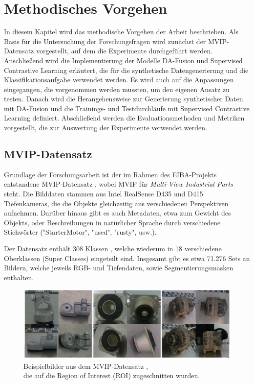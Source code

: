 \chapter{Methodisches Vorgehen}

In diesem Kapitel wird das methodische Vorgehen der Arbeit beschrieben. Als Basis für die Untersuchung der Forschungsfragen wird zunächst der MVIP-Datensatz vorgestellt, auf dem die Experimente durchgeführt werden. Anschließend wird die Implementierung der Modelle DA-Fusion und Supervised Contrastive Learning erläutert, die für die synthetische Datengenerierung und die Klassifikationsaufgabe verwendet werden. Es wird auch auf die Anpassungen eingegangen, die vorgenommen werden mussten, um den eigenen Ansatz zu testen. Danach wird die Herangehensweise zur Generierung synthetischer Daten mit DA-Fusion und die Trainings- und Testdurchläufe mit Supervised Contrastive Learning definiert. Abschließend werden die Evaluationsmethoden und Metriken vorgestellt, die zur Auswertung der Experimente verwendet werden.

\section{MVIP-Datensatz} \label{sec:dataset}


Grundlage der Forschungsarbeit ist der im Rahmen des EIBA-Projekts entstandene MVIP-Datensatz \parencite{Koch2023mvip}, wobei MVIP für \textit{Multi-View Industrial Parts} steht. Die Bilddaten stammen aus Intel RealSense D435 und D415 Tiefenkameras, die die Objekte gleichzeitig aus verschiedenen Perspektiven aufnehmen. Darüber hinaus gibt es auch Metadaten, etwa zum Gewicht des Objekts, oder Beschreibungen in natürlicher Sprache durch verschiedene Stichwörter ("StarterMotor", "used", "rusty", usw.).

Der Datensatz enthält 308 Klassen , welche wiederum in 18 verschiedene Oberklassen (Super Classes) eingeteilt sind. Insgesamt gibt es etwa 71.276 Sets an Bildern, welche jeweils RGB- und Tiefendaten, sowie Segmentierungsmasken enthalten.

\begin{figure}
	\centering
	\includegraphics[width=\textwidth]{figure_mvip_ex_cropped_2.png}
	\caption{Beispielbilder aus dem MVIP-Datensatz \parencite{Koch2023mvip},\\
	die auf die Region of Interest (ROI) zugeschnitten wurden.}
	\label{fig:mvip-examples}
\end{figure}

